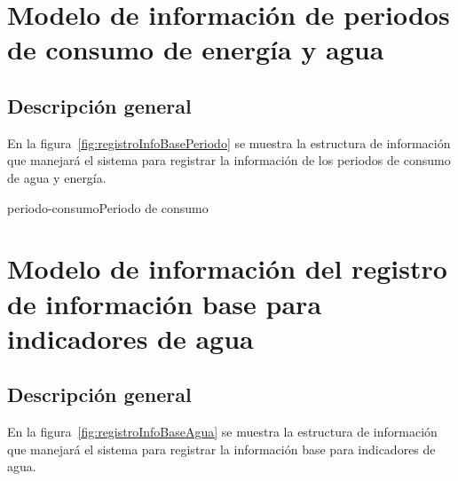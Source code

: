 
\section{Modelo de información de periodos de consumo de energía y agua}

\subsection{Descripción general}
 En la figura~\ref{fig:registroInfoBasePeriodo} se muestra la estructura de información que manejará el sistema para registrar la información de los periodos de consumo de agua y energía.
 

\begin{BusinessEntity}{periodo-consumo}{Periodo de consumo}
\end{BusinessEntity}


\section{Modelo de información del registro de información base para indicadores de agua}

\subsection{Descripción general}
 En la figura~\ref{fig:registroInfoBaseAgua} se muestra la estructura de información que manejará el sistema para registrar la información base para indicadores de agua.
 

